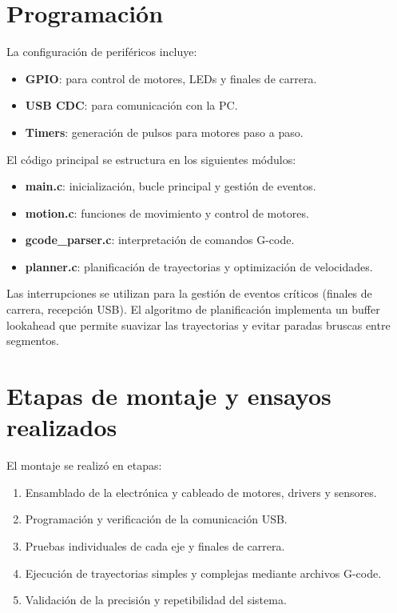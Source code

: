 \documentclass[a4paper,12pt]{article}
\begin{document}

\section{Programación}
La configuración de periféricos incluye:
\begin{itemize}
    \item \textbf{GPIO}: para control de motores, LEDs y finales de carrera.
    \item \textbf{USB CDC}: para comunicación con la PC.
    \item \textbf{Timers}: generación de pulsos para motores paso a paso.
\end{itemize}
El código principal se estructura en los siguientes módulos:
\begin{itemize}
    \item \textbf{main.c}: inicialización, bucle principal y gestión de eventos.
    \item \textbf{motion.c}: funciones de movimiento y control de motores.
    \item \textbf{gcode\_parser.c}: interpretación de comandos G-code.
    \item \textbf{planner.c}: planificación de trayectorias y optimización de velocidades.
\end{itemize}
Las interrupciones se utilizan para la gestión de eventos críticos (finales de carrera, recepción USB). El algoritmo de planificación implementa un buffer lookahead que permite suavizar las trayectorias y evitar paradas bruscas entre segmentos.

\section{Etapas de montaje y ensayos realizados}
El montaje se realizó en etapas:
\begin{enumerate}
    \item Ensamblado de la electrónica y cableado de motores, drivers y sensores.
    \item Programación y verificación de la comunicación USB.
    \item Pruebas individuales de cada eje y finales de carrera.
    \item Ejecución de trayectorias simples y complejas mediante archivos G-code.
    \item Validación de la precisión y repetibilidad del sistema.
\end{enumerate}
\end{document}
